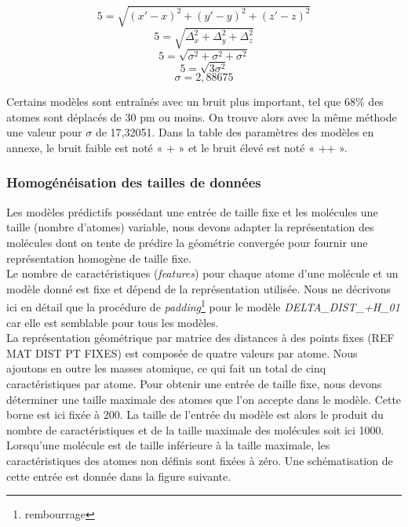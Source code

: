 \vspace{0.7cm}

\[
	5 = \sqrt{(x'-x)^2 + (y'-y)^2 + (z'-z)^2}
\]
\[
	5 = \sqrt{\Delta_x^2 + \Delta_y^2 + \Delta_z^2}
\]
\[
	5 = \sqrt{\sigma^2 + \sigma^2 + \sigma^2}
\]
\[
	5 = \sqrt{3\sigma^2}
\]
\[
	\sigma = 2,88675
\]

\vspace{0.7cm}

Certains modèles sont entraînés avec un bruit plus important, tel que 68\% des atomes sont déplacés de 30 pm ou moins. On trouve alors avec la même méthode une valeur pour $\sigma$ de 17,32051. Dans la table des paramètres des modèles en annexe, le bruit faible est noté « + » et le bruit élevé est noté « ++ ».

\subsubsection{Homogénéisation des tailles de données}

Les modèles prédictifs possédant une entrée de taille fixe et les molécules une taille (nombre d'atomes) variable, nous devons adapter la représentation des molécules dont on tente de prédire la géométrie convergée pour fournir une représentation homogène de taille fixe.\\
Le nombre de caractéristiques (\emph{features}) pour chaque atome d'une molécule et un modèle donné est fixe et dépend de la représentation utilisée. Nous ne décrivons ici en détail que la procédure de \emph{padding}\footnote{rembourrage} pour le modèle \emph{DELTA\_DIST\_+H\_01} car elle est semblable pour tous les modèles.\\
La représentation géométrique par matrice des distances à des points fixes (REF MAT DIST PT FIXES) est composée de quatre valeurs par atome. Nous ajoutons en outre les masses atomique, ce qui fait un total de cinq caractéristiques par atome. Pour obtenir une entrée de taille fixe, nous devons déterminer une taille maximale des atomes que l'on accepte dans le modèle. Cette borne est ici fixée à 200. La taille de l'entrée du modèle est alors le produit du nombre de caractéristiques et de la taille maximale des molécules soit ici 1000. Lorsqu'une molécule est de taille inférieure à la taille maximale, les caractéristiques des atomes non définis sont fixées à zéro. Une schématisation de cette entrée est donnée dans la figure suivante.

